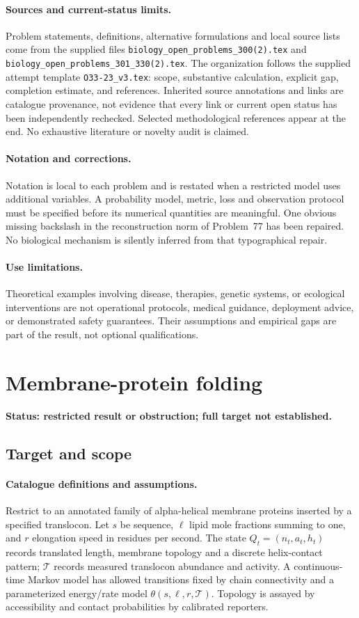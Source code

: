 \documentclass[11pt]{article}
\begin{document}
\paragraph{Sources and current-status limits.}
Problem statements, definitions, alternative formulations and local source lists
come from the supplied files
\texttt{biology\_open\_problems\_300(2).tex} and
\texttt{biology\_open\_problems\_301\_330(2).tex}.
The organization follows the supplied attempt template
\texttt{O33-23\_v3.tex}: scope, substantive calculation, explicit gap,
completion estimate, and references. Inherited source annotations and links are
catalogue provenance, not evidence that every link or current open status has
been independently rechecked. Selected methodological references appear at the
end. No exhaustive literature or novelty audit is claimed.

\paragraph{Notation and corrections.}
Notation is local to each problem and is restated when a restricted model uses
additional variables. A probability model, metric, loss and observation protocol
must be specified before its numerical quantities are meaningful. One obvious
missing backslash in the reconstruction norm of Problem~77 has been repaired.
No biological mechanism is silently inferred from that typographical repair.

\paragraph{Use limitations.}
Theoretical examples involving disease, therapies, genetic systems, or ecological
interventions are not operational protocols, medical guidance, deployment advice,
or demonstrated safety guarantees. Their assumptions and empirical gaps are part
of the result, not optional qualifications.


\section*{Membrane-protein folding}
\label{prob:002}
\noindent\textbf{Status: restricted result or obstruction; full target not established.}
\subsection{Target and scope}
\paragraph{Catalogue definitions and assumptions.}
Restrict to an annotated family of alpha-helical membrane proteins inserted by a specified translocon. Let $s$ be sequence, $\ell$ lipid mole fractions summing to one, and $r$ elongation speed in residues per second. The state $Q_t=(n_t,a_t,h_t)$ records translated length, membrane topology and a discrete helix-contact pattern; $\mathcal T$ records measured translocon abundance and activity. A continuous-time Markov model has allowed transitions fixed by chain connectivity and a parameterized energy/rate model $\theta(s,\ell,r,\mathcal T)$. Topology is assayed by accessibility and contact probabilities by calibrated reporters.
\end{document}
